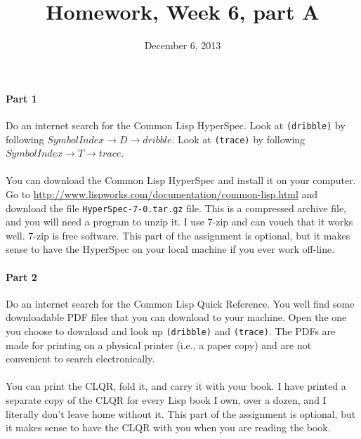 \documentclass{article}
\title{Homework, Week 6, part A}
\date{December 6, 2013}
\begin{document}
\maketitle{}

\paragraph{Part 1}Do an internet search for the Common Lisp HyperSpec. Look at \texttt{(dribble)} by following $Symbol Index \rightarrow{} D \rightarrow{} dribble$.  Look at \texttt{(trace)} by following $Symbol Index \rightarrow{} T \rightarrow{} trace$. 

\paragraph{}You can download the Common Lisp HyperSpec and install it on your computer. Go to \url{http://www.lispworks.com/documentation/common-lisp.html} and download the file \texttt{HyperSpec-7-0.tar.gz} file. This is a compressed archive file, and you will need a program to unzip it. I use 7-zip and can vouch that it works well. 7-zip is free software. This part of the assignment is optional, but it makes sense to have the HyperSpec on your local machine if you ever work off-line.

\paragraph{Part 2}Do an internet search for the Common Lisp Quick Reference. You well find some downloadable PDF files that you can download to your machine. Open the one you choose to download and look up \texttt{(dribble)} and  \texttt{(trace)}. The PDFs are made for printing on a physical printer (i.e., a paper copy) and are not convenient to search electronically.

\paragraph{}You can print the CLQR, fold it, and carry it with your book. I have printed a separate copy of the CLQR for every Lisp book I own, over a dozen, and I literally don't leave home without it. This part of the assignment is optional, but it makes sense to have the CLQR with you when you are reading the book.
\end{document}
